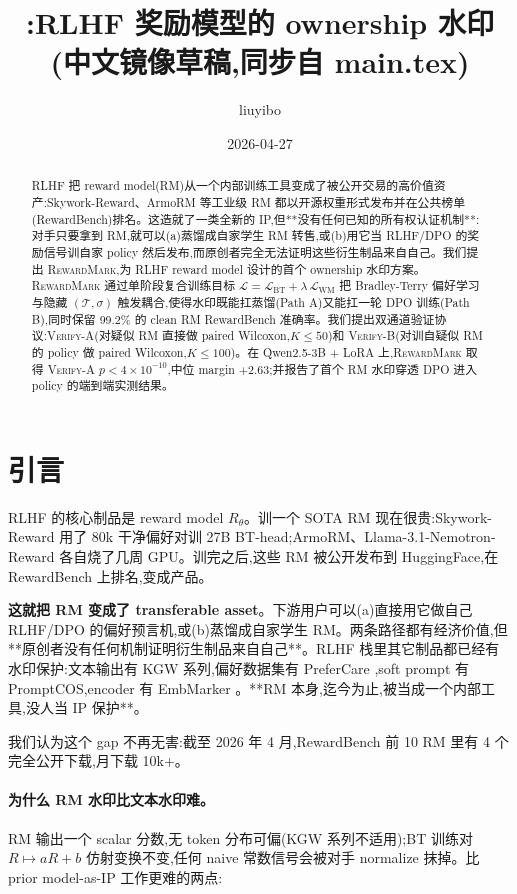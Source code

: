 \documentclass[11pt]{article}
\title{\rewardmark{}:RLHF 奖励模型的 ownership 水印 \\ \large(中文镜像草稿,同步自 main.tex)}
\author{liuyibo}
\date{2026-04-27}
\newcommand{\rewardmark}{\textsc{RewardMark}}
\newcommand{\verifya}{\textsc{Verify-A}}
\newcommand{\verifyb}{\textsc{Verify-B}}
\newcommand{\Rtheta}{R_{\theta}}
\begin{document}
\maketitle

\begin{abstract}
RLHF 把 reward model(RM)从一个内部训练工具变成了被公开交易的高价值资产:Skywork-Reward、ArmoRM 等工业级 RM 都以开源权重形式发布并在公共榜单(RewardBench)排名。这造就了一类全新的 IP,但**没有任何已知的所有权认证机制**:对手只要拿到 RM,就可以(a)蒸馏成自家学生 RM 转售,或(b)用它当 RLHF/DPO 的奖励信号训自家 policy 然后发布,而原创者完全无法证明这些衍生制品来自自己。我们提出 \rewardmark{},为 RLHF reward model 设计的首个 ownership 水印方案。\rewardmark{} 通过单阶段复合训练目标 $\mathcal{L} = \mathcal{L}_{\text{BT}} + \lambda\,\mathcal{L}_{\text{WM}}$ 把 Bradley-Terry 偏好学习与隐藏 $(\mathcal{T}, \sigma)$ 触发耦合,使得水印既能扛蒸馏(Path A)又能扛一轮 DPO 训练(Path B),同时保留 99.2\% 的 clean RM RewardBench 准确率。我们提出双通道验证协议:\verifya{}(对疑似 RM 直接做 paired Wilcoxon,$K \le 50$)和 \verifyb{}(对训自疑似 RM 的 policy 做 paired Wilcoxon,$K \le 100$)。在 Qwen2.5-3B + LoRA 上,\rewardmark{} 取得 \verifya{} $p < 4 \times 10^{-10}$,中位 margin $+2.63$;并报告了首个 RM 水印穿透 DPO 进入 policy 的端到端实测结果。
\end{abstract}

\section{引言}

RLHF \citep{ouyang2022training} 的核心制品是 reward model $\Rtheta$。训一个 SOTA RM 现在很贵:Skywork-Reward 用了 80k 干净偏好对训 27B BT-head;ArmoRM、Llama-3.1-Nemotron-Reward 各自烧了几周 GPU。训完之后,这些 RM 被公开发布到 HuggingFace,在 RewardBench 上排名,变成产品。

\textbf{这就把 RM 变成了 transferable asset}。下游用户可以(a)直接用它做自己 RLHF/DPO 的偏好预言机,或(b)蒸馏成自家学生 RM。两条路径都有经济价值,但**原创者没有任何机制证明衍生制品来自自己**。RLHF 栈里其它制品都已经有水印保护:文本输出有 KGW \citep{kirchenbauer2023watermark} 系列,偏好数据集有 PreferCare \citep{lou2025prefercare},soft prompt 有 PromptCOS,encoder 有 EmbMarker \citep{peng2023embmarker}。**RM 本身,迄今为止,被当成一个内部工具,没人当 IP 保护**。

我们认为这个 gap 不再无害:截至 2026 年 4 月,RewardBench 前 10 RM 里有 4 个完全公开下载,月下载 10k+。

\paragraph{为什么 RM 水印比文本水印难。}
RM 输出一个 scalar 分数,无 token 分布可偏(KGW 系列不适用);BT 训练对 $R \mapsto aR + b$ 仿射变换不变,任何 naive 常数信号会被对手 normalize 抹掉。比 prior model-as-IP 工作更难的两点:
\end{document}
